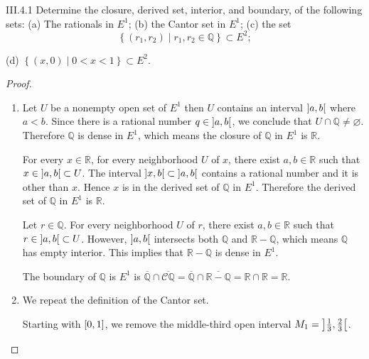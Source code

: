 \begin{problem}{III.4.1}
Determine the closure, derived set, interior, and boundary, of the following sets: (a) The rationals in \( E^{1} \); (b) the Cantor set in \(E^{1}\); (c) the set
\[
	\left\{ (r_{1}, r_{2}) \mid r_{1}, r_{2} \in \mathbb{Q} \right\} \subset E^{2};
\]

(d) \( \left\{ (x, 0) \mid 0 < x < 1 \right\} \subset E^{2} \).
\end{problem}

\begin{proof}
	\begin{enumerate}[label={(\alph*)},itemsep=0pt]
		\item Let \( U \) be a nonempty open set of \( E^{1} \) then \( U \) contains an interval \( \left]{a, b}\right[ \) where \( a < b \). Since there is a rational number \( q \in \left]{a, b}\right[ \), we conclude that \( U \cap \mathbb{Q} \ne \varnothing \). Therefore \( \mathbb{Q} \) is dense in \( E^{1} \), which means the closure of \( \mathbb{Q} \) in \( E^{1} \) is \( \mathbb{R} \).

		      For every \( x \in \mathbb{R} \), for every neighborhood \( U \) of \( x \), there exist \( a, b \in \mathbb{R} \) such that \( x \in \left]{a, b}\right[ \subset U \). The interval \( \left]{x, b}\right[ \subset \left]{a, b}\right[ \) contains a rational number and it is other than \( x \). Hence \( x \) is in the derived set of \( \mathbb{Q} \) in \( E^{1} \). Therefore the derived set of \( \mathbb{Q} \) in \( E^{1} \) is \( \mathbb{R} \).

		      Let \( r \in \mathbb{Q} \). For every neighborhood \( U \) of \( r \), there exist \( a, b \in \mathbb{R} \) such that \( r \in \left]{a, b}\right[ \subset U \). However, \( \left]{a, b}\right[ \) intersects both \( \mathbb{Q} \) and \( \mathbb{R} - \mathbb{Q} \), which means \( \mathbb{Q} \) has empty interior. This implies that \( \mathbb{R} - \mathbb{Q} \) is dense in \( E^{1} \).

		      The boundary of \( \mathbb{Q} \) is \( E^{1} \) is \( \overline{\mathbb{Q}} \cap \overline{\mathscr{C}\mathbb{Q}} = \overline{\mathbb{Q}} \cap \overline{\mathbb{R} - \mathbb{Q}} = \mathbb{R} \cap \mathbb{R} = \mathbb{R} \).
		\item We repeat the definition of the Cantor set.

		      Starting with \( \left[{0, 1}\right] \), we remove the middle-third open interval \( M_{1} = \left]{\frac{1}{3}, \frac{2}{3}}\right[ \).


\end{enumerate}
\end{proof}
